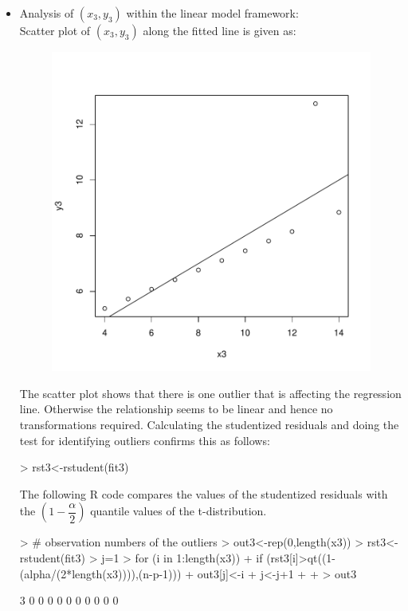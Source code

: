 \documentclass[12pt]{article}
\begin{document}
\begin{itemize}
\item Analysis of $(x_3, y_3)$ within the linear model framework:\\
Scatter plot of $(x_3, y_3)$ along the fitted line is given as:
\begin{figure}[H]
\includegraphics{HW6-019}
\end{figure}
The scatter plot shows that there is one outlier that is affecting the regression line. Otherwise the relationship seems to be linear and hence no transformations required. Calculating the studentized residuals and doing the test for identifying outliers confirms this as follows:
\begin{Schunk}
\begin{Sinput}
> rst3<-rstudent(fit3)
\end{Sinput}
\end{Schunk}
The following R code compares the values of the studentized residuals with the $\left(1-\dfrac{\alpha}{2}\right)$ quantile values of the t-distribution.

\begin{Schunk}
\begin{Sinput}
> # observation numbers of the outliers
> out3<-rep(0,length(x3))
> rst3<-rstudent(fit3)
> j=1
> for (i in 1:length(x3)){
+   if (rst3[i]>qt((1-(alpha/(2*length(x3)))),(n-p-1))){
+     out3[j]<-i
+     j<-j+1
+   }
+ }
> out3
\end{Sinput}
\begin{Soutput}
 [1] 3 0 0 0 0 0 0 0 0 0 0
\end{Soutput}
\end{Schunk}


\end{itemize}
\end{document}
